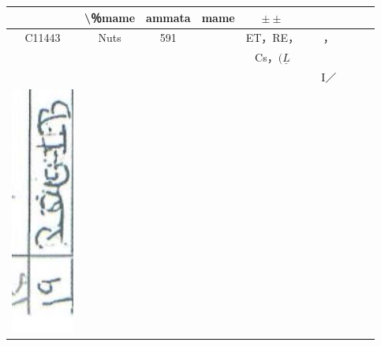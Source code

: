 \documentclass[10pt]{article}
\begin{document}
\begin{center}
\begin{tabular}{|c|c|c|c|c|c|c|c|c|c|}
 & \textbackslash ％mame & ammata & mame & \(\pm \pm\) &  &  & \multicolumn{3}{|l|}{\multirow[t]{2}{*}{}} \\
\hline
C11443 & Nuts & 591 &  & ET，RE， &  & ， &  &  &  \\
\hline
 &  &  &  & Cs，\((\underline{L}\) &  &  &  &  &  \\
\hline
 &  &  &  &  &  & I／ &  &  &  \\
\hline
\includegraphics[max width=\textwidth]{2025_02_27_dd68c3d38de88f0516d9g-070(4)}

\end{tabular}
\end{center}
\end{document}
